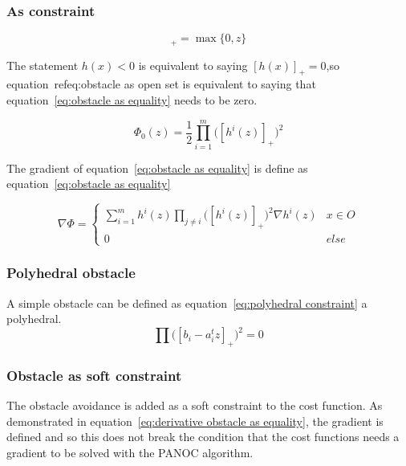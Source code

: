 			\subsubsection{As constraint}
				\begin{equation}
					[z]_+ =  \max\{0,z\}
				\end{equation}
				
				The statement $h(x)<0$ is equivalent to saying $[h(x)]_+=0$,so equation~ref{eq:obstacle as open set} is equivalent to saying that equation~\ref{eq:obstacle as equality} needs to be zero.
				
				\begin{equation}
					\Phi_0(z) =  \frac{1}{2} \prod_{i=1}^m \Big( [h^i(z)]_+ \Big)^2
					\label{eq:obstacle as equality}
				\end{equation}
				
				The gradient of equation~\ref{eq:obstacle as equality} is define as equation~\ref{eq:obstacle as equality}
				
				\begin{equation}
					\nabla \Phi =
					\begin{cases}
						\sum_{i=1}^{m} h^i(z)\prod_{j \ne i} \Big( [h^i(z)]_+ \Big)^2 \nabla h^i(z)
						& x \in O \\
						0 & else
					\end{cases}
					\label{eq:derivative obstacle as equality}
				\end{equation}
			
			\subsubsection{Polyhedral obstacle}
				A simple obstacle can be defined as equation~\ref{eq:polyhedral constraint} a polyhedral.
				\begin{equation}
					\prod \Big([b_i - a_i^t z]_+ \Big)^2 = 0
					\label{eq:polyhedral constraint}
				\end{equation}
			
			\subsubsection{Obstacle as soft constraint}
				The obstacle avoidance is added as a soft constraint to the cost function. As demonstrated in equation~\ref{eq:derivative obstacle as equality}, the gradient is defined and so this does not break the condition that the cost functions needs a gradient to be solved with the PANOC algorithm.
			
